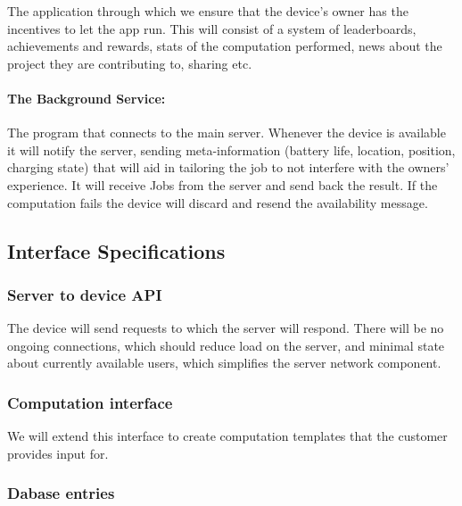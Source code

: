 \documentclass[a4paper,10pt]{article}
\begin{document}
The application through which we ensure that the device's owner has the incentives to let the app run. This will consist of a system of leaderboards, achievements and rewards, stats of the  computation performed, news about the project they are contributing to, sharing etc.

\paragraph{The Background Service:} 
The program that connects to the main server. Whenever the device is available it will notify the server, sending meta-information (battery life, location, position, charging state) that will aid in tailoring the job to not interfere with the owners' experience. It will receive Jobs from the server and send back the result. If the computation fails the device will discard and resend the availability message.



\subsection{Interface Specifications}


\subsubsection{Server to device API}

The device will send requests to which the server will respond.
There will be no ongoing connections, which should reduce load on the server, and minimal state about currently available users, which simplifies the server network component.



\newpage
\subsubsection{Computation interface}

We will extend this interface to create computation templates that the customer provides input for.

\newpage




\subsubsection{Dabase entries}
\end{document}
